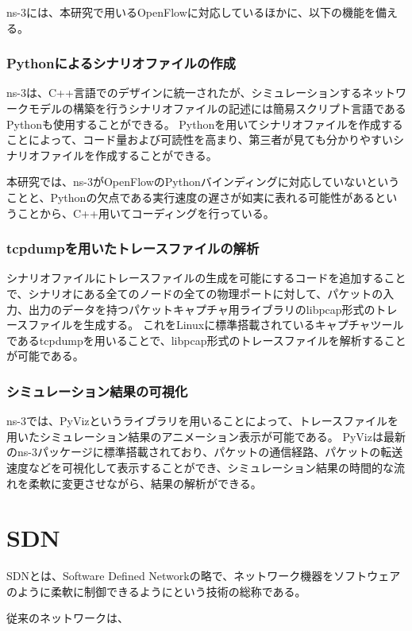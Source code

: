 ns-3には、本研究で用いるOpenFlowに対応しているほかに、以下の機能を備える。

\subsubsection{Pythonによるシナリオファイルの作成}

ns-3は、C++言語でのデザインに統一されたが、シミュレーションするネットワークモデルの構築を行うシナリオファイルの記述には簡易スクリプト言語であるPythonも使用することができる。
Pythonを用いてシナリオファイルを作成することによって、コード量および可読性を高まり、第三者が見ても分かりやすいシナリオファイルを作成することができる。

本研究では、ns-3がOpenFlowのPythonバインディングに対応していないということと、Pythonの欠点である実行速度の遅さが如実に表れる可能性があるということから、C++用いてコーディングを行っている。

\subsubsection{tcpdumpを用いたトレースファイルの解析}

シナリオファイルにトレースファイルの生成を可能にするコードを追加することで、シナリオにある全てのノードの全ての物理ポートに対して、パケットの入力、出力のデータを持つパケットキャプチャ用ライブラリのlibpcap形式のトレースファイルを生成する。
これをLinuxに標準搭載されているキャプチャツールであるtcpdumpを用いることで、libpcap形式のトレースファイルを解析することが可能である。

\subsubsection{シミュレーション結果の可視化}

ns-3では、PyVizというライブラリを用いることによって、トレースファイルを用いたシミュレーション結果のアニメーション表示が可能である。
PyVizは最新のns-3パッケージに標準搭載されており、パケットの通信経路、パケットの転送速度などを可視化して表示することができ、シミュレーション結果の時間的な流れを柔軟に変更させながら、結果の解析ができる。

\section{SDN}

SDNとは、Software Defined Networkの略で、ネットワーク機器をソフトウェアのように柔軟に制御できるようにという技術の総称である。\cite{SDN}

従来のネットワークは、